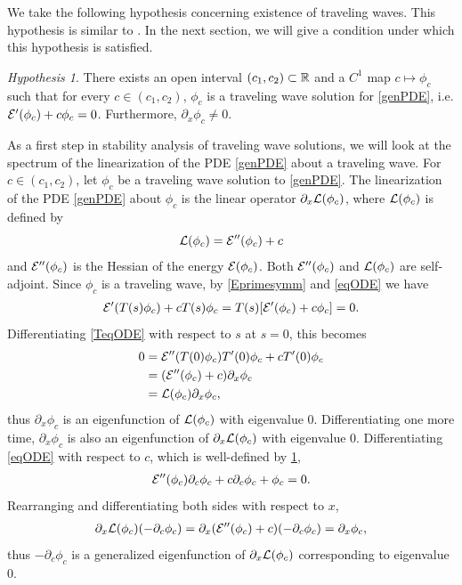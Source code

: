 \documentclass[11pt,reqno]{amsart}
\theoremstyle{plain}
\theoremstyle{definition}
\theoremstyle{remark}
\newtheorem{hypothesis}[theorem]{Hypothesis}
\begin{document}
We take the following hypothesis concerning existence of traveling waves. This hypothesis is similar to \cite[Assumption 2]{Grillakis1987}. In the next section, we will give a condition under which this hypothesis is satisfied. 
\begin{hypothesis}\label{cintervalhyp}
There exists an open interval $(c_1, c_2) \subset \mathbb{R}$ and a $C^1$ map $c \mapsto \phi_c$ such that for every $c \in (c_1, c_2)$, $\phi_c$ is a traveling wave solution for \cref{genPDE}, i.e. $\mathcal{E}'(\phi_c) + c \phi_c = 0$. Furthermore, $\partial_x \phi_c \neq 0$.
\end{hypothesis}

As a first step in stability analysis of traveling wave solutions, we will look at the spectrum of the linearization of the PDE \cref{genPDE} about a traveling wave. For $c \in (c_1, c_2)$, let $\phi_c$ be a traveling wave solution to \cref{genPDE}. The linearization of the PDE \cref{genPDE} about $\phi_c$ is the linear operator $\partial_x \mathcal{L}(\phi_c)$, where $\mathcal{L}(\phi_c)$ is defined by
\begin{equation}\label{PDElinearization}
\mathcal{L}(\phi_c) = \mathcal{E}''(\phi_c) + c
\end{equation}
and $\mathcal{E}''(\phi_c)$ is the Hessian of the energy $\mathcal{E}(\phi_c)$. Both $\mathcal{E}''(\phi_c)$ and $\mathcal{L}(\phi_c)$ are self-adjoint. Since $\phi_c$ is a traveling wave, by \cref{Eprimesymm} and \cref{eqODE} we have
\begin{align}\label{TeqODE}
\mathcal{E}'(T(s)\phi_c) + c T(s)\phi_c = T(s)[\mathcal{E}'(\phi_c) + c \phi_c] = 0.
\end{align}
Differentiating \cref{TeqODE} with respect to $s$ at $s = 0$, this becomes
\begin{align*}
0 &= \mathcal{E}''(T(0)\phi_c)T'(0)\phi_c + c T'(0)\phi_c \\
&= (\mathcal{E}''(\phi_c) + c ) \partial_x \phi_c \\
&= \mathcal{L}(\phi_c) \partial_x \phi_c,
\end{align*}
thus $\partial_x \phi_c$ is an eigenfunction of $\mathcal{L}(\phi_c)$ with eigenvalue 0. Differentiating one more time, $\partial_x \phi_c$ is also an eigenfunction of $\partial_x \mathcal{L}(\phi_c)$ with eigenvalue 0. Differentiating \cref{eqODE} with respect to $c$, which is well-defined by \cref{cintervalhyp},
\begin{align*}
\mathcal{E}''(\phi_c)\partial_c \phi_c + c \partial_c \phi_c + \phi_c = 0.
\end{align*}
Rearranging and differentiating both sides with respect to $x$,
\begin{align*}
\partial_x \mathcal{L}(\phi_c) (-\partial_c \phi_c) 
= \partial_x (\mathcal{E}''(\phi_c) + c )(-\partial_c \phi_c) = \partial_x\phi_c,
\end{align*}
thus $-\partial_c \phi_c$ is a generalized eigenfunction of $\partial_x \mathcal{L}(\phi_c)$ corresponding to eigenvalue 0.
\end{document}
